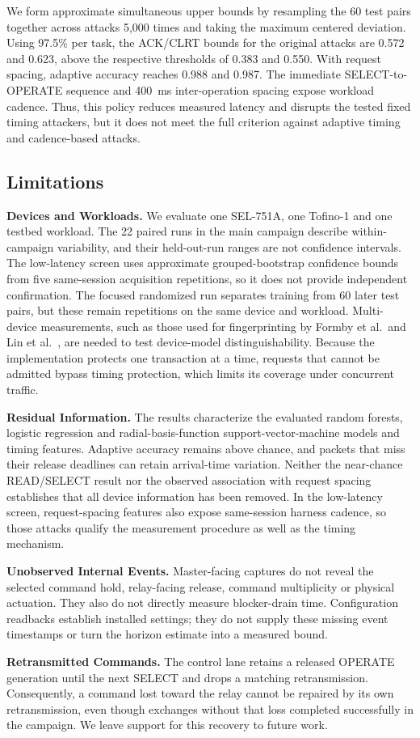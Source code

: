 We form approximate simultaneous upper bounds by resampling the 60 test pairs together across
attacks 5{,}000 times and taking the maximum centered deviation. Using 97.5\% per task, the
ACK/CLRT bounds for the original attacks are 0.572 and 0.623, above the respective thresholds
of 0.383 and 0.550. With request spacing, adaptive accuracy reaches 0.988 and 0.987. The immediate
SELECT-to-OPERATE sequence and 400~ms inter-operation spacing expose workload cadence.
Thus, this policy reduces measured latency and disrupts the tested fixed timing attackers, but
it does not meet the full criterion against adaptive timing and cadence-based attacks.

\subsection{Limitations}
\label{sec:eval:limits}

\textbf{Devices and Workloads.} We evaluate one SEL-751A, one Tofino-1 and one testbed workload.
The 22 paired runs in the main campaign describe within-campaign variability, and their held-out-run
ranges are not confidence intervals. The low-latency screen uses approximate grouped-bootstrap
confidence bounds from five same-session acquisition repetitions, so it does not provide
independent confirmation. The focused randomized run separates training from 60 later test pairs,
but these remain repetitions on the same device and workload. Multi-device measurements, such as those used
for fingerprinting by Formby et al.\ and Lin et al.~\cite{formby2016, defrec2020}, are needed to
test device-model distinguishability. Because the implementation protects one transaction at a time, requests that cannot be admitted
bypass timing protection, which limits its coverage under concurrent traffic.

\textbf{Residual Information.} The results characterize the evaluated random forests, logistic
regression and radial-basis-function support-vector-machine models and timing features. Adaptive accuracy remains above chance, and packets that miss their release deadlines
can retain arrival-time variation. Neither the near-chance READ/SELECT result nor the observed
association with request spacing establishes that all device information has been removed. In the
low-latency screen, request-spacing features also expose same-session harness cadence, so those
attacks qualify the measurement procedure as well as the timing mechanism.

\textbf{Unobserved Internal Events.} Master-facing captures do not reveal the selected command
hold, relay-facing release, command multiplicity or physical actuation. They also do not directly
measure blocker-drain time. Configuration readbacks establish installed settings; they do not
supply these missing event timestamps or turn the horizon estimate into a measured bound.

\textbf{Retransmitted Commands.} The control lane retains a released OPERATE generation until
the next SELECT and drops a matching retransmission. Consequently, a command lost toward the relay cannot be repaired by its own retransmission, even
though exchanges without that loss completed successfully in the campaign. We leave support for
this recovery to future work.
